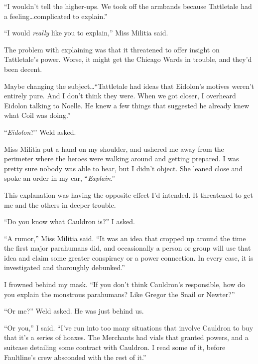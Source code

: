 ``I wouldn't tell the higher-ups.  We took off the armbands because Tattletale had a feeling\ldots complicated to explain.''



``I would \emph{really} like you to explain,'' Miss Militia said.



The problem with explaining was that it threatened to offer insight on Tattletale's power.  Worse, it might get the Chicago Wards in trouble, and they'd been decent.



Maybe changing the subject\ldots ``Tattletale had ideas that Eidolon's motives weren't entirely pure.  And I don't think they were.  When we got closer, I overheard Eidolon talking to Noelle.  He knew a few things that suggested he already knew what Coil was doing.''



``\emph{Eidolon}?'' Weld asked.



Miss Militia put a hand on my shoulder, and ushered me away from the perimeter where the heroes were walking around and getting prepared.  I was pretty sure nobody was able to hear, but I didn't object.  She leaned close and spoke an order in my ear, ``\emph{Explain}.''



This explanation was having the opposite effect I'd intended.  It threatened to get me and the others in deeper trouble.



``Do you know what Cauldron is?'' I asked.



``A rumor,'' Miss Militia said.  ``It was an idea that cropped up around the time the first major parahumans did, and occasionally a person or group will use that idea and claim some greater conspiracy or a power connection.  In every case, it is investigated and thoroughly debunked.''



I frowned behind my mask.  ``If you don't think Cauldron's responsible, how do you explain the monstrous parahumans?  Like Gregor the Snail or Newter?''



``Or me?'' Weld asked.  He was just behind us.



``Or you,'' I said.  ``I've run into too many situations that involve Cauldron to buy that it's a series of hoaxes.  The Merchants had vials that granted powers, and a suitcase detailing some contract with Cauldron.  I read some of it, before Faultline's crew absconded with the rest of it.''



